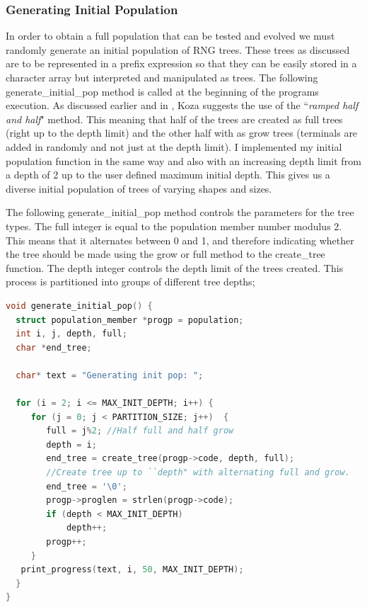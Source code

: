 \documentclass[a4paper,10.5pt]{article}
\begin{document}
\subsubsection{Generating Initial Population}
In order to obtain a full population that can be tested and evolved we must randomly generate an initial population of RNG trees. These trees as discussed are to be represented in a prefix expression so that they can be easily stored in a character array but interpreted and manipulated as trees. The following generate\_initial\_pop method is called at the beginning of the programs execution. As discussed earlier and in \cite[p.11-14]{introgp}, Koza suggests the use of the ``\emph{ramped half and half}" method. This meaning that half of the trees are created as full trees (right up to the depth limit) and the other half with as grow trees (terminals are added in randomly and not just at the depth limit). I implemented my initial population function in the same way and also with an increasing depth limit from a depth of 2 up to the user defined maximum initial depth. This gives us a diverse initial population of trees of varying shapes and sizes.

The following generate\_initial\_pop method controls the parameters for the tree types. The full integer is equal to the population member number modulus 2. This means that it alternates between 0 and 1, and therefore indicating whether the tree should be made using the grow or full method to the create\_tree function. The depth integer controls the depth limit of the trees created. This process is partitioned into groups of different tree depths;
\begin{lstlisting}[language=C]
void generate_initial_pop() { 
  struct population_member *progp = population;
  int i, j, depth, full;
  char *end_tree;

  char* text = "Generating init pop: ";

  for (i = 2; i <= MAX_INIT_DEPTH; i++) {
     for (j = 0; j < PARTITION_SIZE; j++)  {  
        full = j%2; //Half full and half grow
        depth = i;
        end_tree = create_tree(progp->code, depth, full);
        //Create tree up to ``depth" with alternating full and grow.
        end_tree = '\0';
        progp->proglen = strlen(progp->code);
        if (depth < MAX_INIT_DEPTH) 
            depth++;
        progp++;
     }
   print_progress(text, i, 50, MAX_INIT_DEPTH);
  }
}
\end{lstlisting}
\end{document}
